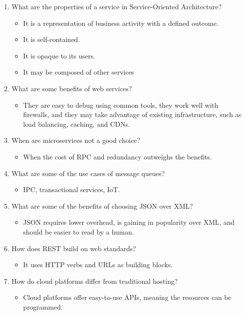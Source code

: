 \begin{enumerate}
\item
What are the properties of a service in Service-Oriented Architecture?
\begin{itemize}
\item 
It is a representation of business activity with a defined outcome.

\item 
It is self-contained.

\item 
It is opaque to its users.

\item 
It may be composed of other services
\end{itemize}

\item
What are some benefits of web services?
\begin{itemize}
\item 
They are easy to debug using common tools, they work well with firewalls, and they may take advantage of existing infrastructure, such as load balancing, caching, and CDNs.
\end{itemize}

\item
When are microservices not a good choice?
\begin{itemize}
\item 
When the cost of RPC and redundancy outweighs the benefits.
\end{itemize}

\item
What are some of the use cases of message queues?
\begin{itemize}
\item 
IPC, transactional services, IoT.
\end{itemize}

\item
What are some of the benefits of choosing JSON over XML?
\begin{itemize}
\item 
JSON requires lower overhead, is gaining in popularity over XML, and should be easier to read by a human.
\end{itemize}

\item
How does REST build on web standards?
\begin{itemize}
\item 
It uses HTTP verbs and URLs as building blocks.
\end{itemize}

\item
How do cloud platforms differ from traditional hosting?
\begin{itemize}
\item 
Cloud platforms offer easy-to-use APIs, meaning the resources can be
programmed.
\end{itemize}
\end{enumerate}